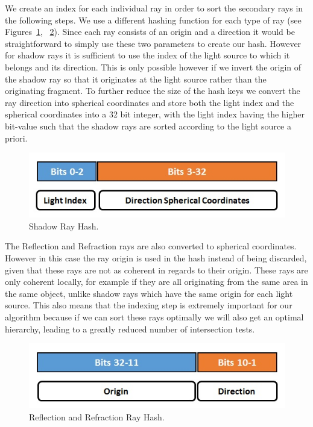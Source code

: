 We create an index for each individual ray in order to sort the secondary rays in the following steps. We use a different hashing function for each type of ray (see Figures~\ref{fig:srh}, ~\ref{fig:rrh}). Since each ray consists of an origin and a direction it would be straightforward to simply use these two parameters to create our hash. However for shadow rays it is sufficient to use the index of the light source to which it belongs and its direction. This is only possible however if we invert the origin of the shadow ray so that it originates at the light source rather than the originating fragment. To further reduce the size of the hash keys we convert the ray direction into spherical coordinates \cite{GraphicGems5} and store both the light index and the spherical coordinates into a 32 bit integer, with the light index having the higher bit-value such that the shadow rays are sorted according to the light source a priori.

\medskip

\begin{figure}[!htb]
    \centering
    \includegraphics[scale=0.85]{Images/Shadow_Hash}
    \caption{\label{fig:srh}Shadow Ray Hash.}
\end{figure}

The Reflection and Refraction rays are also converted to spherical coordinates. However in this case the ray origin is used in the hash instead of being discarded, given that these rays are not as coherent in regards to their origin. These rays are only coherent locally, for example if they are all originating from the same area in the same object, unlike shadow rays which have the same origin for each light source. This also means that the indexing step is extremely important for our algorithm because if we can sort these rays optimally we will also get an optimal hierarchy, leading to a greatly reduced number of intersection tests.

\begin{figure}[!htb]
    \centering
    \includegraphics[scale=0.85]{Images/Reflection_Hash}
    \caption{\label{fig:rrh}Reflection and Refraction Ray Hash.}
\end{figure}

